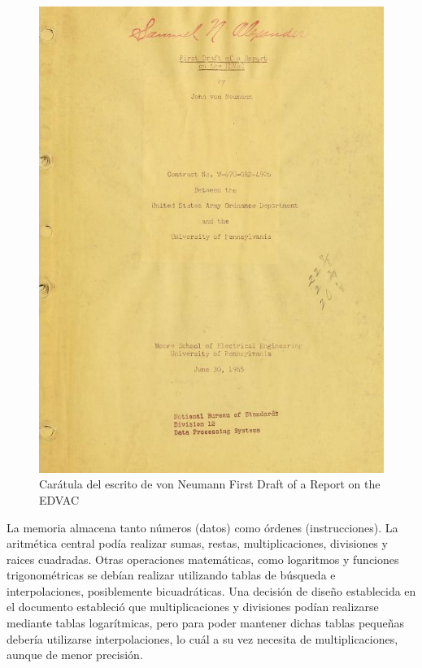 \begin{figure}
  \centering
  \includegraphics[scale=0.25]{./figures/C02-von_neumann_first_draft}
  \captionsetup{justification=centering}
  \caption{Carátula del escrito de von Neumann First Draft of a Report on the EDVAC}
  \label{fig:C02-von_neumann_first_draft}
\end{figure}
La memoria almacena tanto números (datos) como órdenes (instrucciones).
La aritmética central podía realizar sumas, restas, multiplicaciones, divisiones
y raices cuadradas. Otras operaciones matemáticas, como logaritmos y funciones
trigonométricas se debían realizar utilizando tablas de búsqueda e
interpolaciones, posiblemente bicuadráticas. Una decisión de diseño establecida
en el documento estableció que multiplicaciones y divisiones podían realizarse
mediante tablas logarítmicas, pero para poder mantener dichas tablas pequeñas
debería utilizarse interpolaciones, lo cuál a su vez necesita de
multiplicaciones, aunque de menor precisión.\\
